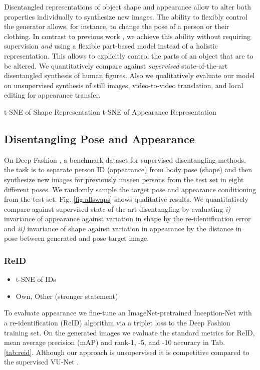 	Disentangled representations of object shape and appearance allow to alter both properties individually to synthesize new images. The ability to flexibly control the generator allows, for instance, to change the pose of a person or their clothing. In contrast to previous work \cite{esser18, denton17disvideo, ma17poseguided, ma17disperson, debem18dgpose, jakab18},
	we achieve this ability without requiring supervision \textit{and} using a flexible part-based model instead of a holistic representation. This allows to explicitly control the parts of an object that are to be altered. We quantitatively compare against \emph{supervised} state-of-the-art disentangled synthesis of human figures. Also we qualitatively evaluate our model on unsupervised synthesis of still images, video-to-video translation, and local editing for appearance transfer.


	t-SNE of Shape Representation
	t-SNE of Appearance Representation


	\subsection{Disentangling Pose and Appearance}


	On Deep Fashion \cite{liu16deepfashion, liu16deepfashionwild}, a benchmark dataset for supervised disentangling methods, the task is to separate person ID (appearance) from body pose (shape) and then synthesize new images for previously unseen persons from the test set in eight different poses. We randomly sample the target pose and appearance conditioning from the test set. Fig. \ref{fig:allswaps} shows qualitative results.
	We quantitatively compare against supervised state-of-the-art disentangling \cite{esser18} by evaluating \emph{i)} invariance of appearance against variation in shape by the re-identification error and \emph{ii)} invariance of shape against variation in appearance by the distance in pose between generated and pose target image.

	\subsubsection{ReID}
	\begin{itemize}
		\item t-SNE of IDs
		\item Own, Other (stronger statement)
	\end{itemize}
	To evaluate appearance we fine-tune an ImageNet-pretrained \cite{russakovsky15imagenet} Inception-Net \cite{szegedy15inception} with a re-identification (ReID) algorithm \cite{xiao17reidjoint} via a triplet loss \cite{hermans17reidtriplet} to the Deep Fashion training set.
	On the generated images we evaluate the standard metrics for ReID, mean average precision (mAP) and rank-1, -5, and -10 accuracy in Tab. \ref{tab:reid}.
	Although our approach is unsupervised it is competitive compared to the supervised VU-Net \cite{esser18}.


